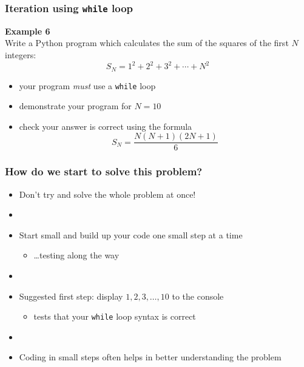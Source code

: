 \documentclass[english,14pt]{beamer}
\begin{document}
%
%
%


\begin{frame}[fragile]

\frametitle{Iteration using \texttt{while} loop}

\textbf{Example 6}\\
\vspace*{5mm}
Write a Python program which calculates the sum of the squares of the first $N$ integers:
\[
S_N = 1^2 + 2^2 + 3^2 + \cdots + N^2
\]

\begin{itemize}
	\item your program \emph{must} use a \texttt{while} loop
	\item demonstrate your program for $N=10$
	\item check your answer is correct using the formula
	\[
		S_N = \frac{N(N+1)(2N+1)}{6}
	\]

\end{itemize}

\end{frame}


\begin{frame}[fragile]

\frametitle{How do we start to solve this problem?}

\begin{itemize}
	\item Don't try and solve the whole problem at once!
	\item[]
	\item Start small and build up your code one small step at a time
	\begin{itemize}
		\item \ldots testing along the way
	\end{itemize}
	\item[]
	\item Suggested first step: display $1,2,3,\ldots,10$ to the console
	\begin{itemize}
		\item tests that your \texttt{while} loop syntax is correct
	\end{itemize}
	\item[]
	\item Coding in small steps often helps in better understanding the problem
\end{itemize}

\end{frame}
\end{document}
